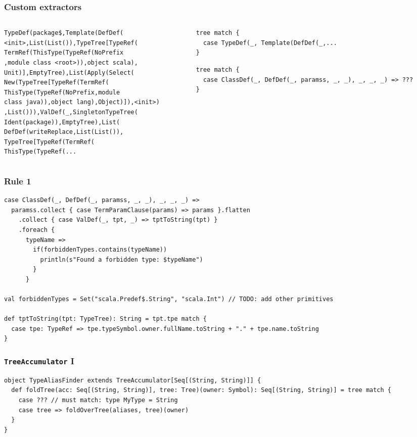 \documentclass[aspectratio=169]{beamer}
\begin{document}
\begin{frame}[fragile]
\frametitle{Custom extractors}
\begin{columns}
\begin{column}{0.6\textwidth}
  \begin{lstlisting}[style=myTerminal,frame=none]
TypeDef(package$,Template(DefDef(
<init>,List(List()),TypeTree[TypeRef(
TermRef(ThisType(TypeRef(NoPrefix
,module class <root>)),object scala),
Unit)],EmptyTree),List(Apply(Select(
New(TypeTree[TypeRef(TermRef(
ThisType(TypeRef(NoPrefix,module
class java)),object lang),Object)]),<init>)
,List())),ValDef(_,SingletonTypeTree(
Ident(package)),EmptyTree),List(
DefDef(writeReplace,List(List()),
TypeTree[TypeRef(TermRef(
ThisType(TypeRef(...
\end{lstlisting}
\end{column}

\begin{column}{0.4\textwidth}
\begin{lstlisting}[style=myScalastyle,frame=none]
tree match {
  case TypeDef(_, Template(DefDef(_,...
}
\end{lstlisting}
\pause
\begin{lstlisting}[style=myScalastyle,frame=none]
tree match {
  case ClassDef(_, DefDef(_, paramss, _, _), _, _, _) => ???
}
\end{lstlisting}
\end{column}
\end{columns}
\end{frame}

\begin{frame}[fragile]
\frametitle{Rule 1}
\begin{lstlisting}[style=myScalastyle,frame=none]
case ClassDef(_, DefDef(_, paramss, _, _), _, _, _) =>
  paramss.collect { case TermParamClause(params) => params }.flatten
    .collect { case ValDef(_, tpt, _) => tptToString(tpt) }
    .foreach {
      typeName =>
        if(forbiddenTypes.contains(typeName))
          println(s"Found a forbidden type: $typeName")
        }
      }
      
val forbiddenTypes = Set("scala.Predef$.String", "scala.Int") // TODO: add other primitives
      
def tptToString(tpt: TypeTree): String = tpt.tpe match {
  case tpe: TypeRef => tpe.typeSymbol.owner.fullName.toString + "." + tpe.name.toString
}
\end{lstlisting}
\end{frame}

\begin{frame}[fragile]
\frametitle{\texttt{TreeAccumulator} I}
\begin{lstlisting}[style=myScalastyle,frame=none]
object TypeAliasFinder extends TreeAccumulator[Seq[(String, String)]] {
  def foldTree(acc: Seq[(String, String)], tree: Tree)(owner: Symbol): Seq[(String, String)] = tree match {
    case ??? // must match: type MyType = String
    case tree => foldOverTree(aliases, tree)(owner)
  }
}
\end{lstlisting}

\end{frame}
\end{document}
